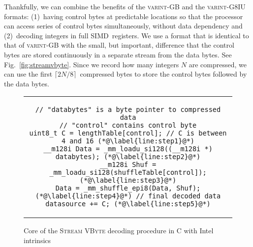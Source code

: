 \documentclass[compress]{elsarticle}
\newcommand{\vbyte}{VByte}
\newcommand{\varintgb}{\textsc{varint-GB}}
\newcommand{\streamvbyte}{\textsc{Stream \vbyte{}}}
\newcommand{\varintgiu}{\textsc{varint-G8IU}}
\begin{document}
Thankfully, we can combine the benefits of the \varintgb{} and the
\varintgiu{} formats: (1)~having control bytes at predictable locations
so that the processor can access series of control bytes simultaneously,
without data dependency and (2)~decoding integers in full
SIMD~registers.
We use a format that is identical to that of \varintgb{} with the
small, but important, difference that the control bytes are
stored continuously in a separate stream from the data bytes.
See Fig.~\ref{fig:streamvbyte}.
Since we record how many integers $N$ are compressed, we can
 use the first $\lceil  2N / 8  \rceil $~compressed
bytes to store the control bytes followed by the data bytes.

\lstset{escapechar=@,style=customc}

\begin{figure}[b]\centering
\begin{tabular}{c}
\begin{lstlisting}
// "databytes" is a byte pointer to compressed data
// "control" contains control byte
uint8_t C = lengthTable[control]; // C is between 4 and 16 (*@\label{line:step1}@*)
__m128i Data = _mm_loadu_si128((__m128i *) databytes); (*@\label{line:step2}@*)
__m128i Shuf = _mm_loadu_si128(shuffleTable[control]); (*@\label{line:step3}@*)
Data = _mm_shuffle_epi8(Data, Shuf); (*@\label{line:step4}@*) // final decoded data
datasource += C; (*@\label{line:step5}@*)
\end{lstlisting}
\end{tabular}
\caption{\label{fig:code}Core of the \streamvbyte{} decoding procedure in C with Intel intrinsics}
\end{figure}
\end{document}
